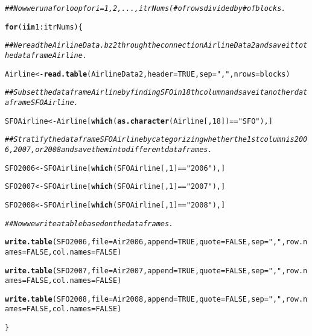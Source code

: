 \documentclass[english]{article}\usepackage[]{graphicx}\usepackage[]{color}
\makeatletter
\newcommand{\hlnum}[1]{\textcolor[rgb]{0.686,0.059,0.569}{#1}}%
\newcommand{\hlstr}[1]{\textcolor[rgb]{0.192,0.494,0.8}{#1}}%
\newcommand{\hlcom}[1]{\textcolor[rgb]{0.678,0.584,0.686}{\textit{#1}}}%
\newcommand{\hlopt}[1]{\textcolor[rgb]{0,0,0}{#1}}%
\newcommand{\hlstd}[1]{\textcolor[rgb]{0.345,0.345,0.345}{#1}}%
\newcommand{\hlkwa}[1]{\textcolor[rgb]{0.161,0.373,0.58}{\textbf{#1}}}%
\newcommand{\hlkwb}[1]{\textcolor[rgb]{0.69,0.353,0.396}{#1}}%
\newcommand{\hlkwc}[1]{\textcolor[rgb]{0.333,0.667,0.333}{#1}}%
\newcommand{\hlkwd}[1]{\textcolor[rgb]{0.737,0.353,0.396}{\textbf{#1}}}%
\newenvironment{kframe}{%
 \def\at@end@of@kframe{}%
 \ifinner\ifhmode%
  \def\at@end@of@kframe{\end{minipage}}%
  \begin{minipage}{\columnwidth}%
 \fi\fi%
 \def\FrameCommand##1{\hskip\@totalleftmargin \hskip-\fboxsep
 \colorbox{shadecolor}{##1}\hskip-\fboxsep
     \hskip-\linewidth \hskip-\@totalleftmargin \hskip\columnwidth}%
 \MakeFramed {\advance\hsize-\width
   \@totalleftmargin\z@ \linewidth\hsize
   \@setminipage}}%
 {\par\unskip\endMakeFramed%
 \at@end@of@kframe}
\newenvironment{knitrout}{}{} %
\makeatother
\begin{document}
\begin{knitrout}
\color{fgcolor}\begin{kframe}
\begin{alltt}
\hlcom{## Now we run a for loop for i=1,2,...,itrNums(# of rows divided by # of blocks.}

\hlkwa{for} \hlstd{(i} \hlkwa{in} \hlnum{1}\hlopt{:}\hlstd{itrNums) \{}

\hlcom{## We read the AirlineData.bz2 through the connection AirlineData2 and save it to the data frame Airline.}

  \hlstd{Airline}\hlkwb{<-}\hlkwd{read.table}\hlstd{(AirlineData2,} \hlkwc{header} \hlstd{=} \hlnum{TRUE}\hlstd{,} \hlkwc{sep} \hlstd{=} \hlstr{","}\hlstd{,} \hlkwc{nrows} \hlstd{= blocks)}

\hlcom{## Subset the data frame Airline by finding SFO in 18th column and save it another data frame SFOAirline.}

 \hlstd{SFOAirline}\hlkwb{<-}\hlstd{Airline[}\hlkwd{which}\hlstd{(}\hlkwd{as.character}\hlstd{(Airline[,}\hlnum{18}\hlstd{])}\hlopt{==}\hlstr{"SFO"}\hlstd{),]}

\hlcom{## Stratify the data frame SFOAirline by categorizing whether the 1st column is 2006,2007, or 2008 and save them into different data frames.}

\hlstd{SFO2006}\hlkwb{<-}\hlstd{SFOAirline[}\hlkwd{which}\hlstd{(SFOAirline[,}\hlnum{1}\hlstd{]}\hlopt{==}\hlstr{"2006"}\hlstd{),]}

\hlstd{SFO2007}\hlkwb{<-}\hlstd{SFOAirline[}\hlkwd{which}\hlstd{(SFOAirline[,}\hlnum{1}\hlstd{]}\hlopt{==}\hlstr{"2007"}\hlstd{),]}

\hlstd{SFO2008}\hlkwb{<-}\hlstd{SFOAirline[}\hlkwd{which}\hlstd{(SFOAirline[,}\hlnum{1}\hlstd{]}\hlopt{==}\hlstr{"2008"}\hlstd{),]}

\hlcom{## Now we write a table based on the data frames.}

\hlkwd{write.table}\hlstd{(SFO2006,} \hlkwc{file}\hlstd{=Air2006,} \hlkwc{append}\hlstd{=}\hlnum{TRUE}\hlstd{,} \hlkwc{quote}\hlstd{=}\hlnum{FALSE}\hlstd{,} \hlkwc{sep}\hlstd{=}\hlstr{","}\hlstd{,} \hlkwc{row.names}\hlstd{=}\hlnum{FALSE}\hlstd{,} \hlkwc{col.names}\hlstd{=}\hlnum{FALSE}\hlstd{)}

\hlkwd{write.table}\hlstd{(SFO2007,} \hlkwc{file}\hlstd{=Air2007,} \hlkwc{append}\hlstd{=}\hlnum{TRUE}\hlstd{,} \hlkwc{quote}\hlstd{=}\hlnum{FALSE}\hlstd{,} \hlkwc{sep}\hlstd{=}\hlstr{","}\hlstd{,} \hlkwc{row.names}\hlstd{=}\hlnum{FALSE}\hlstd{,} \hlkwc{col.names}\hlstd{=}\hlnum{FALSE}\hlstd{)}

\hlkwd{write.table}\hlstd{(SFO2008,} \hlkwc{file}\hlstd{=Air2008,} \hlkwc{append}\hlstd{=}\hlnum{TRUE}\hlstd{,} \hlkwc{quote}\hlstd{=}\hlnum{FALSE}\hlstd{,} \hlkwc{sep}\hlstd{=}\hlstr{","}\hlstd{,} \hlkwc{row.names}\hlstd{=}\hlnum{FALSE}\hlstd{,} \hlkwc{col.names}\hlstd{=}\hlnum{FALSE}\hlstd{)}

 \hlstd{\}}
\end{alltt}
\end{kframe}
\end{knitrout}
\end{document}
